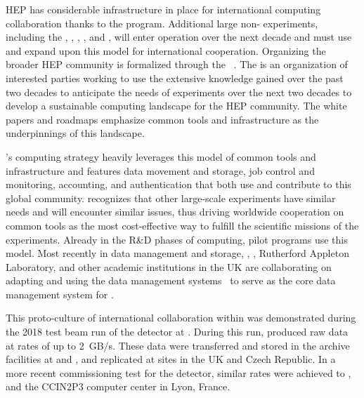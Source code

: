 HEP has considerable infrastructure in place for international computing collaboration thanks to the  program.  Additional large non- experiments, including the , , , , and ,  will enter operation over the next decade and must use and expand upon this model for international cooperation.  Organizing the broader HEP community is formalized through the ~\cite{Alves:2017she}.  The  is an organization of interested parties working to use the extensive knowledge gained over the past two decades to %
anticipate the needs of experiments %
over the next two decades to develop a sustainable computing landscape for the HEP community.  The  white papers and roadmaps emphasize common tools and infrastructure as the underpinnings of this landscape.

's computing strategy heavily leverages this model of common tools and infrastructure and features data movement and storage, job control and monitoring, accounting, and authentication that both use and contribute to this global community.    recognizes that other large-scale experiments have similar needs and will encounter similar issues, thus driving worldwide cooperation on common tools as the most cost-effective way to fulfill the scientific missions of the experiments.  Already in the R\&D phases of  computing,  pilot programs use this model.  Most recently in data management and storage, , , Rutherford Appleton Laboratory, and other academic institutions in the %
UK are collaborating on adapting and using the  data management systems~\cite{Barisits:2019fyl}  to serve as the core data management system for .

This proto-culture of international collaboration within  %
was demonstrated during the 2018 test beam run of the  detector  at .  During this run, %
 produced raw data at rates of up to \SI{2}{GB/s}.  These data were transferred and stored in the archive facilities at  and , and replicated at sites in the UK and Czech Republic.  In a more recent commissioning test for the  detector, similar rates %
were achieved to ,  and the CCIN2P3 computer center in Lyon, France.

